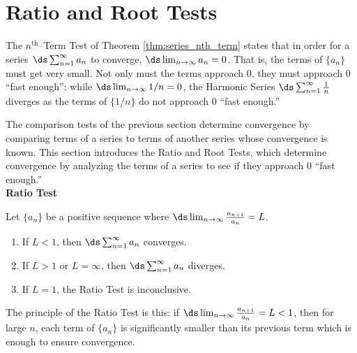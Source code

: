 \section{Ratio and Root Tests}\label{sec:ratio_root_tests}

The $n^\text{th}$--Term Test of Theorem \ref{thm:series_nth_term} states that in order for a series $\ds \sum_{n=1}^\infty a_n$ to converge, $\ds\lim_{n\to\infty}a_n = 0$. That is, the terms of $\{a_n\}$ must get very small. Not only must the terms approach 0, they must approach 0 ``fast enough'': while $\ds \lim_{n\to\infty}1/n=0$, the Harmonic Series $\ds\sum_{n=1}^\infty \frac1n$ diverges as the terms of $\{1/n\}$ do not approach 0 ``fast enough.''

The comparison tests of the previous section determine convergence by comparing terms of a series to terms of another series whose convergence is known. This section introduces the Ratio and Root Tests, which determine convergence by analyzing the terms of a series to see if they approach 0 ``fast enough.''\\

\noindent\textbf{\large Ratio Test}\\

{Let $\{a_n\}$ be a positive sequence where $\ds \lim_{n\to\infty}\frac{a_{n+1}}{a_n} = L$.
		\begin{enumerate}
			\item If $L<1$, then $\ds\sum_{n=1}^\infty a_n$ converges.
			\item	If $L>1$ or $L=\infty$, then $\ds\sum_{n=1}^\infty a_n$ diverges.
			\item If $L=1$, the Ratio Test is inconclusive.
		\end{enumerate}
}

The principle of the Ratio Test is this: if $\ds\lim_{n\to\infty}\frac{a_{n+1}}{a_n} = L<1$, then for large $n$, each term of $\{a_n\}$ is significantly smaller than its previous term which is enough to ensure convergence.\\

